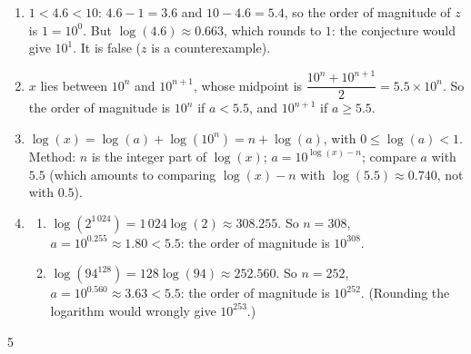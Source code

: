 {\begin{enumerate}
\begin{enumerate}[label=\alph*.]
  \end{enumerate}
\item $1<4.6<10$: $4.6-1=3.6$ and $10-4.6=5.4$, so the order of magnitude of $z$ is $1=10^0$. But $\log(4.6)\approx0.663$, which rounds to $1$: the conjecture would give $10^1$. It is false ($z$ is a counterexample).
\item $x$ lies between $10^n$ and $10^{n+1}$, whose midpoint is $\dfrac{10^n+10^{n+1}}2=5.5\times10^n$. So the order of magnitude is $10^n$ if $a<5.5$, and $10^{n+1}$ if $a\geqslant5.5$.
\item $\log(x)=\log(a)+\log(10^n)=n+\log(a)$, with $0\leqslant\log(a)<1$. Method: $n$ is the integer part of $\log(x)$; $a=10^{\log(x)-n}$; compare $a$ with $5.5$ (which amounts to comparing $\log(x)-n$ with $\log(5.5)\approx0.740$, not with $0.5$).
\item
  \begin{enumerate}[label=\alph*.]
  \item $\log(2^{1\,024})=1\,024\log(2)\approx308.255$. So $n=308$, $a=10^{0.255}\approx1.80<5.5$: the order of magnitude is $10^{308}$.
  \item $\log(94^{128})=128\log(94)\approx252.560$. So $n=252$, $a=10^{0.560}\approx3.63<5.5$: the order of magnitude is $10^{252}$. (Rounding the logarithm would wrongly give $10^{253}$.)
  \end{enumerate}
\end{enumerate}
}{5}

